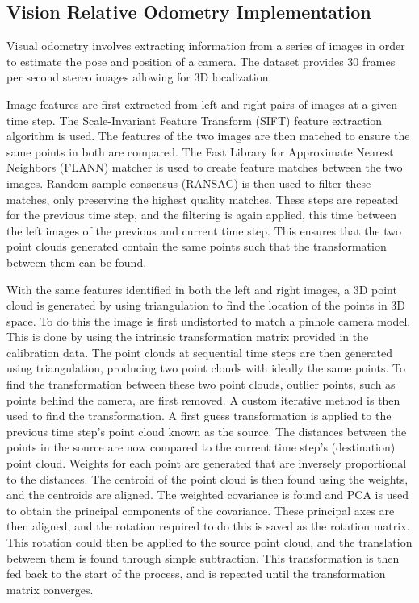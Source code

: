 \documentclass[bare_jrnl_transmag]{subfiles}
\begin{document}
\subsection{Vision Relative Odometry Implementation}

Visual odometry involves extracting information from a series of images in order to estimate the pose and position of a camera. The dataset provides 30 frames per second stereo images allowing for 3D localization. \newline 

Image features are first extracted from left and right pairs of images at a given time step. The Scale-Invariant Feature Transform (SIFT) feature extraction algorithm is used. The features of the two images are then matched to ensure the same points in both are compared. The Fast Library for Approximate Nearest Neighbors (FLANN) matcher is used to create feature matches between the two images.  Random sample consensus (RANSAC) is then used to filter these matches, only preserving the highest quality matches.  These steps are repeated for the previous time step, and the filtering is again applied, this time between the left images of the previous and current time step. This ensures that the two point clouds generated contain the same points such that the transformation between them can be found. \newline

With the same features identified in both the left and right images, a 3D point cloud is generated by using triangulation to find the location of the points in 3D space. To do this the image is first undistorted to match a pinhole camera model. This is done by using the intrinsic transformation matrix provided in the calibration data. The point clouds at sequential time steps are then generated using triangulation, producing two point clouds with ideally the same points. To find the transformation between these two point clouds, outlier points, such as points behind the camera, are first removed. A custom iterative method is then used to find the transformation. A first guess transformation is applied to the previous time step's point cloud known as the source. The distances between the points in the source are now compared to the current time step's (destination) point cloud. Weights for each point are generated that are inversely proportional to the distances. The centroid of the point cloud is then found using the weights, and the centroids are aligned. The weighted covariance is found and PCA is used to obtain the principal components of the covariance. These principal axes are then aligned, and the rotation required to do this is saved as the rotation matrix. This rotation could then be applied to the source point cloud, and the translation between them is found through simple subtraction. This transformation is then fed back to the start of the process, and is repeated until the transformation matrix converges. \newline
\end{document}
